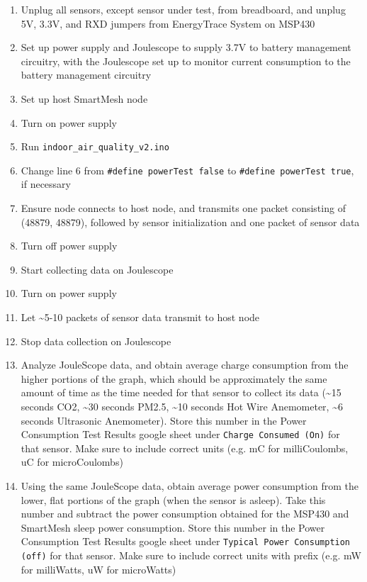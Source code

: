 \begin{enumerate}
\item Unplug all sensors, except sensor under test, from breadboard, and unplug 5V, 3.3V, and RXD jumpers from EnergyTrace System on MSP430
\item Set up power supply and Joulescope to supply 3.7V to battery management circuitry, with the Joulescope set up to monitor current consumption to the battery management circuitry
\item Set up host SmartMesh node
\item Turn on power supply
\item Run \texttt{indoor\_air\_quality\_v2.ino}
\item Change line 6 from \texttt{\#define powerTest false} to \texttt{\#define powerTest true}, if necessary
\item Ensure node connects to host node, and transmits one packet consisting of (48879, 48879), followed by sensor initialization and one packet of sensor data
\item Turn off power supply
\item Start collecting data on Joulescope
\item Turn on power supply
\item Let \textasciitilde5-10 packets of sensor data transmit to host node
\item Stop data collection on Joulescope
\item Analyze JouleScope data, and obtain average charge consumption from the higher portions of the graph, which should be approximately the same amount of time as the time needed for that sensor to collect its data (\textasciitilde15 seconds CO2, \textasciitilde30 seconds PM2.5, \textasciitilde10 seconds Hot Wire Anemometer, \textasciitilde6 seconds Ultrasonic Anemometer). Store this number in the Power Consumption Test Results google sheet under \texttt{Charge Consumed (On)} for that sensor. Make sure to include correct units (e.g. mC for milliCoulombs, uC for microCoulombs)
\item Using the same JouleScope data, obtain average power consumption from the lower, flat portions of the graph (when the sensor is asleep). Take this number and subtract the power consumption obtained for the MSP430 and SmartMesh sleep power consumption. Store this number in the Power Consumption Test Results google sheet under \texttt{Typical Power Consumption (off)} for that sensor. Make sure to include correct units with prefix (e.g. mW for milliWatts, uW for microWatts)
\end{enumerate}
